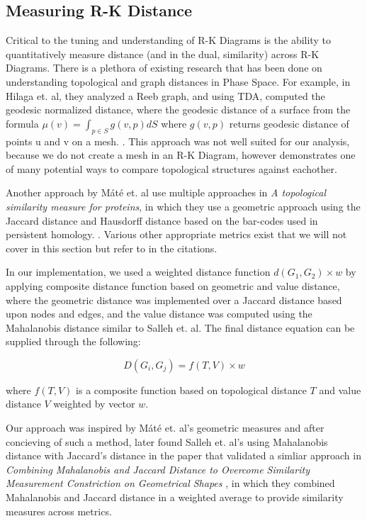 \subsection{Measuring R-K Distance}
\label{sec:rk_distance}

Critical to the tuning and understanding of R-K Diagrams is the ability to quantitatively measure distance (and in the dual, similarity) across R-K Diagrams. There is a plethora of existing research that has been done on understanding topological and graph distances in Phase Space. For example, in Hilaga et. al, they analyzed a Reeb graph, and using TDA, computed the geodesic normalized distance, where the geodesic distance of a surface from the formula $\mu(v) = \int_{p \in S} g(v,p)dS$ where $g(v,p)$ returns geodesic distance of points u and v on a mesh. \cite{hilaga_shinagawa_kohmura_kunii}. This approach was not well suited for our analysis, because we do not create a mesh in an R-K Diagram, however demonstrates one of many potential ways to compare topological structures against eachother.

Another approach by Máté et. al use multiple approaches in \textit{A topological similarity measure for proteins}, in which they use a geometric approach using the Jaccard distance and Hausdorff distance based on the bar-codes used in persistent homology. \cite{mate_hofmann_wenzel_heermann_2014}. Various other appropriate metrics exist that we will not cover in this section but refer to in the citations. \cite{mazandu_mulder_2012} \cite{reuter_2009}

In our implementation, we used a weighted distance function $d(G_{1}, G_{2})\times{w}$ by applying composite distance function based on geometric and value distance, where the geometric distance was implemented over a Jaccard distance based upon nodes and edges, and the value distance was computed using the Mahalanobis distance similar to Salleh et. al\cite{Salleh1_et_al}. The final distance equation can be supplied through the following:

\begin{equation}
D(G_{i},G_{j}) = f(T,V)\times{w}
\end{equation}

where $f(T,V)$ is a composite function based on topological distance $T$ and value distance $V$ weighted by vector $w$.

Our approach was inspired by Máté et. al's geometric measures and after concieving of such a method, later found Salleh et. al's using Mahalanobis distance with Jaccard's distance in the paper that validated a simliar approach in \textit{Combining Mahalanobis and Jaccard Distance to Overcome Similarity Measurement Constriction on Geometrical Shapes} \cite{Salleh1_et_al}, in which they combined Mahalanobis and Jaccard distance in a weighted average to provide similarity measures across metrics.

